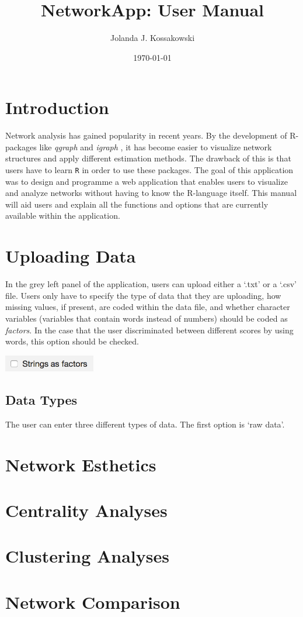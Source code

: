 \documentclass[10pt]{apa}
\begin{document}
\title{NetworkApp: User Manual}
\author{Jolanda J. Kossakowski}
\date{\today}
\maketitle

\tableofcontents

\clearpage

\section{Introduction}

Network analysis has gained popularity in recent years. By the development of R-packages like \emph{qgraph}\cite{epskamp2012} and \emph{igraph} \cite{csardi2006}, it has become easier to visualize network structures and apply different estimation methods. The drawback of this is that users have to learn \texttt{R} in order to use these packages. The goal of this application was to design and programme a web application that enables users to visualize and analyze networks without having to know the R-language itself. This manual will aid users and explain all the functions and options that are currently available within the application. 

\section{Uploading Data}

In the grey left panel of the application, users can upload either a `.txt' or a `.csv' file. Users only have to specify the type of data that they are uploading, how missing values, if present, are coded within the data file, and whether character variables (variables that contain words instead of numbers) should be coded as \emph{factors}. In the case that the user discriminated between different scores by using words, this option should be checked.

\includegraphics[width=0.3\textwidth]{StringAsFactors}


\subsection{Data Types}

The user can enter three different types of data. The first option is `raw data'. 

\section{Network Esthetics}

\section{Centrality Analyses}

\section{Clustering Analyses}

\section{Network Comparison}

\newpage


\end{document}
